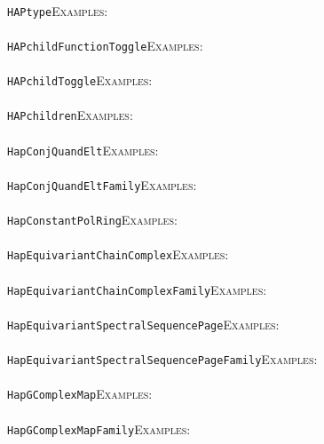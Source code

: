 \documentclass[a4paper,11pt]{report}
\begin{document}
{{ \\
 \texttt{HAP{\textunderscore}type}{\nobreakspace}{\nobreakspace}{\nobreakspace}{\nobreakspace}\textsc{Examples:} \\
 \\
 \texttt{HAPchildFunctionToggle}{\nobreakspace}{\nobreakspace}{\nobreakspace}{\nobreakspace}\textsc{Examples:} \\
 \\
 \texttt{HAPchildToggle}{\nobreakspace}{\nobreakspace}{\nobreakspace}{\nobreakspace}\textsc{Examples:} \\
 \\
 \texttt{HAPchildren}{\nobreakspace}{\nobreakspace}{\nobreakspace}{\nobreakspace}\textsc{Examples:} \\
 \\
 \texttt{HapConjQuandElt}{\nobreakspace}{\nobreakspace}{\nobreakspace}{\nobreakspace}\textsc{Examples:} \\
 \\
 \texttt{HapConjQuandEltFamily}{\nobreakspace}{\nobreakspace}{\nobreakspace}{\nobreakspace}\textsc{Examples:} \\
 \\
 \texttt{HapConstantPolRing}{\nobreakspace}{\nobreakspace}{\nobreakspace}{\nobreakspace}\textsc{Examples:} \\
 \\
 \texttt{HapEquivariantChainComplex}{\nobreakspace}{\nobreakspace}{\nobreakspace}{\nobreakspace}\textsc{Examples:} \\
 \\
 \texttt{HapEquivariantChainComplexFamily}{\nobreakspace}{\nobreakspace}{\nobreakspace}{\nobreakspace}\textsc{Examples:} \\
 \\
 \texttt{HapEquivariantSpectralSequencePage}{\nobreakspace}{\nobreakspace}{\nobreakspace}{\nobreakspace}\textsc{Examples:} \\
 \\
 \texttt{HapEquivariantSpectralSequencePageFamily}{\nobreakspace}{\nobreakspace}{\nobreakspace}{\nobreakspace}\textsc{Examples:} \\
 \\
 \texttt{HapGComplexMap}{\nobreakspace}{\nobreakspace}{\nobreakspace}{\nobreakspace}\textsc{Examples:} \\
 \\
 \texttt{HapGComplexMapFamily}{\nobreakspace}{\nobreakspace}{\nobreakspace}{\nobreakspace}\textsc{Examples:} \\
 \\
}}
\end{document}
